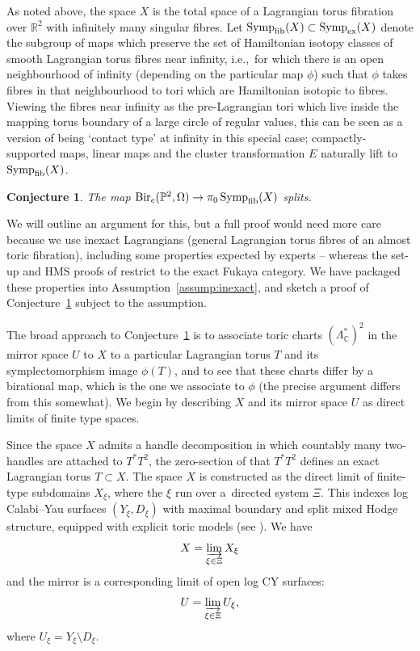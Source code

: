 \documentclass[pdftex]{sigma}
\DeclareMathOperator{\Bir}{Bir}
\DeclareMathOperator{\Symp}{Symp}
\def\bP{\mathbb{P}}
\def\bC{\mathbb{C}}
\def\bR{\mathbb{R}}
\newtheorem{conj}[thm]{Conjecture}
\theoremstyle{definition}
\numberwithin{equation}{section}
\begin{document}
As noted above, the space $X$ is the total space of a Lagrangian torus fibration over $\bR^2$ with infinitely many singular fibres. Let $\Symp_{\rm fib}(X) \subset \Symp_{\rm ex}(X)$ denote the subgroup of maps which preserve the set of Hamiltonian isotopy classes of smooth Lagrangian torus fibres near infinity, i.e.,~for which there is an open neighbourhood of infinity (depending on the particular map $\phi$) such that $\phi$ takes fibres in that neighbourhood to tori which are Hamiltonian isotopic to fibres. Viewing the fibres near infinity as the pre-Lagrangian tori which live inside the mapping torus boundary of a large circle of regular values, this can be seen as a version of being `contact type' at infinity in this special case; compactly-supported maps, linear maps and the cluster transformation $E$ naturally lift to $\Symp_{\rm fib}(X)$.

 \begin{conj}
 \label{conj:birational plane case}
The map $\Bir_e(\bP^2,\Omega) \to \pi_0\Symp_{\rm fib}(X)$ splits.
 \end{conj}

 We will outline an argument for this, but a full proof would need more care because we use inexact Lagrangians (general Lagrangian torus fibres of an almost toric fibration), including some properties expected by experts -- whereas the set-up and HMS proofs of \cite{Keating-Ward} restrict to the exact Fukaya category.
 We have packaged these properties into Assumption~\ref{assump:inexact}, and sketch a proof of Conjecture~\ref{conj:birational plane case} subject to the assumption.

 The broad approach to Conjecture~\ref{conj:birational plane case} is to associate toric charts $(\Lambda_{\bC}^*)^2$ in the mirror space $U$ to $X$ to a particular Lagrangian torus $T$ and its symplectomorphism image $\phi(T)$, and to see that these charts differ by a birational map, which is the one we associate to $\phi$ (the precise argument differs from this somewhat). We begin by describing $X$ and its mirror space $U$ as direct limits of finite type spaces.


 Since the space $X$ admits a handle decomposition in which countably many two-handles are attached to $T^*T^2$, the zero-section of that $T^*T^2$ defines an exact Lagrangian torus $T\subset X$.
 The space $X$ is constructed as the direct limit of finite-type subdomains $X_{\xi}$, where the $\xi$ run over a~directed system $\Xi$.
 This indexes log Calabi--Yau surfaces $(Y_\xi, D_\xi)$ with maximal boundary and split mixed Hodge structure, equipped with explicit toric models (see \cite[Definition 2.4]{Keating-Ward}). We have
\begin{equation*}
 X = \varinjlim_{\xi \in \Xi} X_{\xi}
\end{equation*}
and the mirror is a corresponding limit of open log CY surfaces:
\begin{equation*}
U = \varinjlim_{\xi \in \Xi} U_{\xi},
\end{equation*}
where $U_{\xi} = Y_{\xi} \setminus D_\xi$.
\end{document}
